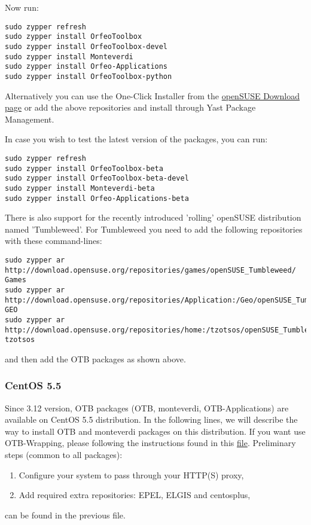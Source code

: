 Now run:
\begin{verbatim}
sudo zypper refresh
sudo zypper install OrfeoToolbox
sudo zypper install OrfeoToolbox-devel
sudo zypper install Monteverdi
sudo zypper install Orfeo-Applications
sudo zypper install OrfeoToolbox-python
\end{verbatim}

Alternatively you can use the One-Click Installer from the \href{http://software.opensuse.org/search?q=Orfeo&baseproject=openSUSE\%3A11.4&lang=en&include_home=true&exclude_debug=true}{openSUSE Download page} or add the above repositories and install through Yast Package Management.

In case you wish to test the latest version of the packages, you can run:
\begin{verbatim}
sudo zypper refresh
sudo zypper install OrfeoToolbox-beta
sudo zypper install OrfeoToolbox-beta-devel
sudo zypper install Monteverdi-beta
sudo zypper install Orfeo-Applications-beta
\end{verbatim}

There is also support for the recently introduced 'rolling' openSUSE distribution named 'Tumbleweed'.
For Tumbleweed you need to add the following repositories with these command-lines:
\begin{verbatim}
sudo zypper ar 
http://download.opensuse.org/repositories/games/openSUSE_Tumbleweed/ Games
sudo zypper ar 
http://download.opensuse.org/repositories/Application:/Geo/openSUSE_Tumbleweed/ GEO
sudo zypper ar 
http://download.opensuse.org/repositories/home:/tzotsos/openSUSE_Tumbleweed/ tzotsos
\end{verbatim}
and then add the OTB packages as shown above.

\subsubsection{CentOS 5.5}
\label{ssec:centos_binaries}
Since 3.12 version, OTB packages (OTB, monteverdi, OTB-Applications) are available on CentOS 5.5 distribution. In the following lines, we will describe the way to install OTB and monteverdi packages on this distribution. If you want use OTB-Wrapping, please following the instructions found in this \href{http://www.orfeo-toolbox.org/packages/centos/5.5/i386/3.12.0/OTB_packages_on_CentOS_5.5.txt}{file}. Preliminary steps (common to all packages):

\begin{enumerate}

  \item Configure your system to pass through your HTTP(S) proxy,

  \item Add required extra repositories: EPEL, ELGIS and centosplus, 

\end{enumerate}
can be found in the previous file.

